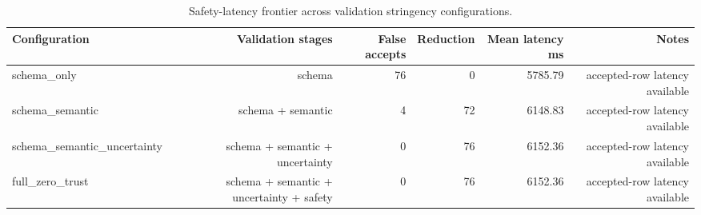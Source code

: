 \begin{table}[htbp]
\centering
\caption{Safety-latency frontier across validation stringency configurations.}
\label{tab:phase4_safety_latency_frontier}
\begin{tabular}{lrrrrr}
\hline
Configuration & Validation stages & False accepts & Reduction & Mean latency ms & Notes \\
\hline
schema\_only & schema & 76 & 0 & 5785.79 & accepted-row latency available \\
schema\_semantic & schema + semantic & 4 & 72 & 6148.83 & accepted-row latency available \\
schema\_semantic\_uncertainty & schema + semantic + uncertainty & 0 & 76 & 6152.36 & accepted-row latency available \\
full\_zero\_trust & schema + semantic + uncertainty + safety & 0 & 76 & 6152.36 & accepted-row latency available \\
\hline
\end{tabular}
\end{table}
